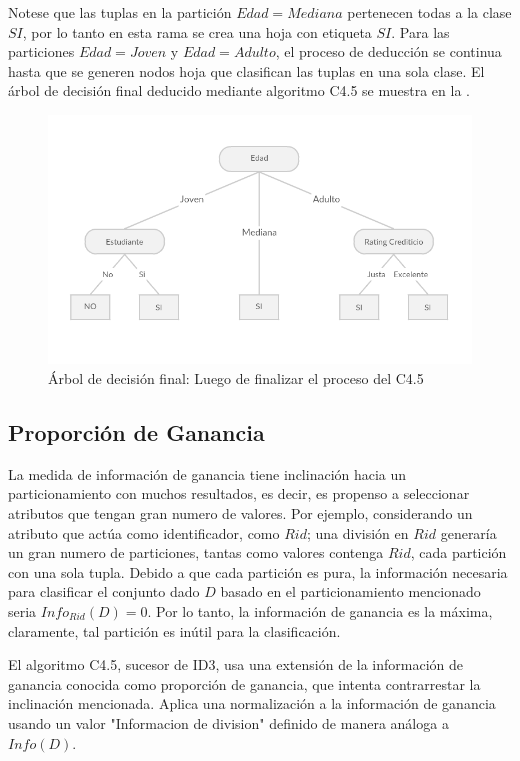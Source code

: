 Notese que las tuplas en la partición $Edad = Mediana$ pertenecen todas a la clase $SI$, por lo tanto en esta rama se crea una hoja con etiqueta $SI$. Para las particiones $Edad = Joven$ y $Edad = Adulto$, el proceso de deducción se continua hasta que se generen nodos hoja que clasifican las tuplas en una sola clase. El
 árbol de decisión final deducido mediante algoritmo C4.5 se muestra en la .
 
\begin{figure}[!tbph]
	\centering
	\includegraphics[width=0.7\linewidth]{capitulo-3/graphics/dtree_parti_final}
	\caption[Árbol de decisión Final]{Árbol de decisión final: Luego de finalizar el proceso del C4.5 }
	\label{fig:arbolFinal}
\end{figure}


\subsection{Proporción de Ganancia}
La medida de información de ganancia tiene inclinación hacia un particionamiento con muchos resultados, es decir, es propenso a seleccionar atributos que tengan gran numero de valores. Por ejemplo, considerando un atributo que actúa como identificador, como $Rid$; una división en $Rid$ generaría un gran numero de particiones, tantas como valores contenga $Rid$, cada partición con una sola tupla. Debido a que cada partición es pura, la información necesaria para clasificar el conjunto dado $D$ basado en el particionamiento mencionado seria $Info_{Rid}(D)=0$. Por lo tanto, la información de ganancia es la máxima, claramente, tal partición es inútil para la clasificación. 

El algoritmo C4.5, sucesor de ID3, usa una extensión de la información de ganancia conocida como proporción de ganancia, que intenta contrarrestar la inclinación mencionada.	Aplica una normalización a la información de ganancia usando un valor "Informacion de division" definido de manera análoga a $Info(D)$.

